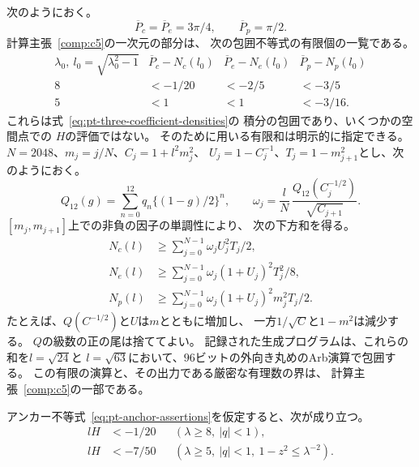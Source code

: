 次のようにおく。
\[
 \overline P_c=\overline P_e=3\pi/4,\qquad
 \overline P_p=\pi/2.
\]
計算主張~\ref{comp:c5}の一次元の部分は、
次の包囲不等式の有限個の一覧である。
\begin{equation}
\begin{array}{c|ccc}
 \lambda_0,\ l_0=\sqrt{\lambda_0^2-1}
 &\overline P_c-N_c(l_0)
 &\overline P_e-N_e(l_0)
 &\overline P_p-N_p(l_0)\\ \hline
 8 &<-1/20&<-2/5&<-3/5\\
 5 &<1&<1&<-3/16 .
\end{array}
\label{eq:pt-anchor-assertions}
\end{equation}
これらは式~\eqref{eq:pt-three-coefficient-densities}の
積分の包囲であり、いくつかの空間点での
$H$の評価ではない。
そのために用いる有限和は明示的に指定できる。
$N=2048$、$m_j=j/N$、$C_j=1+l^2m_j^2$、
$U_j=1-C_j^{-1}$、$T_j=1-m_{j+1}^2$とし、次のようにおく。
\[
 Q_{12}(g)=\sum_{n=0}^{12}q_n\{(1-g)/2\}^n,\qquad
 \omega_j=\frac{l}{N}\,
             \frac{Q_{12}(C_j^{-1/2})}{\sqrt{C_{j+1}}}.
\]
$[m_j,m_{j+1}]$上での非負の因子の単調性により、
次の下方和を得る。
\begin{equation}
\begin{split}
 N_c(l)&\geq\sum_{j=0}^{N-1}
                \omega_j U_j^2T_j/2,\\
 N_e(l)&\geq\sum_{j=0}^{N-1}
                \omega_j(1+U_j)^2T_j^2/8,\\
 N_p(l)&\geq\sum_{j=0}^{N-1}
                \omega_j(1+U_j)^2m_j^2T_j/2 .
\end{split}
\label{eq:pt-explicit-anchor-darboux}
\end{equation}
たとえば、$Q(C^{-1/2})$と$U$は$m$とともに増加し、
一方$1/\sqrt C$と$1-m^2$は減少する。
$Q$の級数の正の尾は捨ててよい。
記録された生成プログラムは、これらの和を$l=\sqrt{24}$と
$l=\sqrt{63}$において、$96$ビットの外向き丸めのArb演算で包囲する。
この有限の演算と、その出力である厳密な有理数の界は、
計算主張~\ref{comp:c5}の一部である。

\begin{lemma}[非有界領域と極領域]
\label{lem:pt-unbounded-and-polar}
アンカー不等式~\eqref{eq:pt-anchor-assertions}を仮定すると、次が成り立つ。
\begin{align}
 lH&<-1/20
 &&(\lambda\geq8,\ |q|<1),\label{eq:pt-unbounded-bound}\\
 lH&<-7/50
 &&(\lambda\geq5,\ |q|<1,\ 1-z^2\leq\lambda^{-2}).
 \label{eq:pt-polar-horizontal-bound}
\end{align}
\end{lemma}

